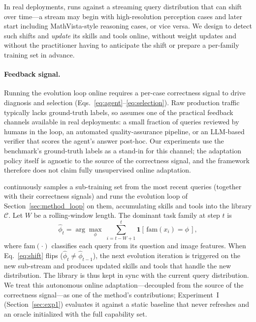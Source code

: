 In real deployments, \sysname{} runs against a streaming query distribution that can shift
over time---a stream may begin with high-resolution perception cases and later start
including MathVista-style reasoning cases, or vice versa. We design \sysname{} to detect
such shifts and \emph{update} its skills and tools online, without weight updates and
without the practitioner having to anticipate the shift or prepare a per-family training
set in advance.

\paragraph{Feedback signal.}
Running the evolution loop online requires a per-case correctness signal to drive
diagnosis and selection (Eqs.~\ref{eq:agent}--\ref{eq:selection}). Raw production traffic
typically lacks ground-truth labels, so \sysname{} assumes one of the practical feedback
channels available in real deployments: a small fraction of queries reviewed by humans in
the loop, an automated quality-assurance pipeline, or an LLM-based verifier that scores
the agent's answer post-hoc. Our experiments use the benchmark's ground-truth labels as a
stand-in for this channel; the adaptation policy itself is agnostic to the source of the
correctness signal, and the framework therefore does not claim fully unsupervised online
adaptation.

\sysname{} continuously samples a sub-training set from the most recent queries (together
with their correctness signals) and runs the evolution loop of
Section~\ref{sec:method_loop} on them, accumulating skills and tools into the library
$\mathcal{C}$. Let $W$ be a rolling-window length. The dominant task family at step $t$ is
\begin{equation}
  \hat{\phi}_t = \arg\max_{\phi}\; \sum_{i = t - W + 1}^{t} \mathbf{1}\!\left[\,\mathrm{fam}(x_i) = \phi\,\right],
  \label{eq:shift}
\end{equation}
where $\mathrm{fam}(\cdot)$ classifies each query from its question and image features.
When Eq.~\ref{eq:shift} flips ($\hat{\phi}_t \neq \hat{\phi}_{t-1}$), the next evolution
iteration is triggered on the new sub-stream and produces updated skills and tools that
handle the new distribution. The library is thus kept in sync with the current query
distribution. We treat this autonomous online adaptation---decoupled from the source of
the correctness signal---as one of the method's contributions; Experiment~I
(Section~\ref{sec:exp1}) evaluates it against a static baseline that never refreshes and
an oracle initialized with the full capability set.
